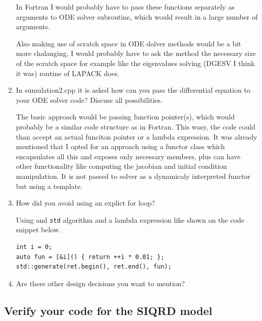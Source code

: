 \documentclass[a4paper]{article}
\newcommand{\answer}[1]{\vspace{-0.75em}\begin{framed} #1 \end{framed}\vspace{-0.75em}}
\begin{document}
\begin{enumerate}
{		In Fortran I would probably have to pass these functions separately as arguments to ODE solver subroutine, which would result in a large number of arguments. 
		
		Also making use of scratch space in ODE dolver methods would be a bit more chalanging, I would probably have to ask the method the necessary size of the scratch space for example like the eigenvalues solving (DGESV I think it was) routine of LAPACK does.
	
}
	\item In sumulation2.cpp it is asked how can you pass the differential equation to your ODE solver code? Discuss all possibilities.
	\answer{
	The basic approach would be passing function pointer(s), which would probably be a similar code structure as in Fortran. This wasy, the code could than accept an actual funciton pointer or a lambda expression. It was already mentioned that I opted for an approach using a functor class which encapsulates all this and exposes only necessary members, plus can have other functionality like computing the jacobian and initial condition manipulation. It is not passed to solver as a dynamicaly interpreted functor but using a template.
}
	\item How did you avoid using an explict for loop?
	\answer{
		Using and \texttt{std} algorithm and a lambda expression like shown on the code snippet below.
	}

\begin{lstlisting}
int i = 0;
auto fun = [&i]() { return ++i * 0.01; };
std::generate(ret.begin(), ret.end(), fun);
\end{lstlisting}

	\item Are there other design decisions you want to mention?
	\answer{}
\end{enumerate}
\subsection*{Verify your code for the SIQRD model}
\end{document}
